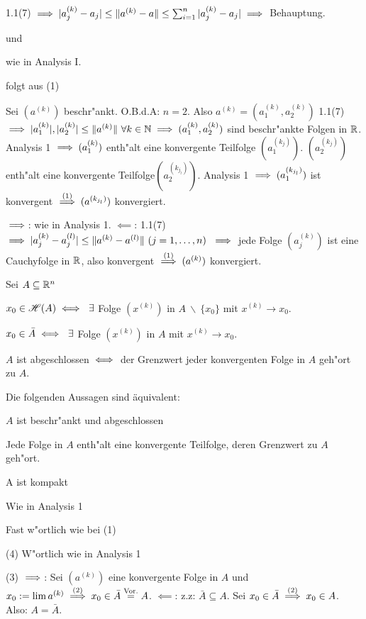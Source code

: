 \documentclass[a4paper,twoside,DIV15,BCOR12mm,chapterprefix=true,headings=twolinechapter]{scrbook}
\begin{document}
\begin{beweise}
  \item 1.1(7) $\implies |a_j^{(k)} - a_j| \le \|a^{(k)}-a\| \le \sum_{i=1}^n|a_j^{(k)} - a_j| \implies $ Behauptung.
  \item und
  \item wie in Analysis I.
  \item folgt aus (1)
  \item Sei $(a^{(k)})$ beschr"ankt. O.B.d.A: $n=2$. Also $a^{(k)}=(a_1^{(k)},a_2^{(k)})$ 1.1(7) $\implies |a_1^{(k)}|,|a_2^{(k)}|\le\|a^{(k)}\|\ \forall k\in\mathbb{N} \implies (a_1^{(k)},a_2^{(k)})$ sind beschr"ankte Folgen in $\mathbb{R}$. Analysis 1 $\implies (a_1^{(k)})$ enth"alt eine konvergente Teilfolge $(a_1^{(k_j)})$. $(a_2^{(k_j)})$ enth"alt eine konvergente Teilfolge$ (a_2^{(k_{j_l})})$. Analysis 1 $\implies (a_1^{(k_{j_l})})$ ist konvergent $\overset{(1)}{\implies} (a^{(k_{j_l})})$ konvergiert.
  \item \glqq$\implies$\grqq: wie in Analysis 1. \glqq$\impliedby$\grqq: 1.1(7) $\implies |a_j^{(k)}-a_j^{(l)}| \le \|a^{(k)}-a^{(l)}\|\ (j=1,\ldots,n)\ \implies$ jede Folge $(a_j^{(k)})$ ist eine Cauchyfolge in $\mathbb{R}$, also konvergent $\overset{(1)}{\implies} (a^{(k)})$ konvergiert.
\end{beweise}

\begin{satz}
Sei $A\subseteq\mathbb{R}^n$
\begin{liste}
\item $x_0 \in \mathscr{H}(A)\iff\ \exists$ Folge $(x^{(k)})$ in $A\ \backslash\ \{x_0\}$ mit $x^{(k)}\to x_0$.
\item $x_0 \in \bar A\iff\ \exists$ Folge $(x^{(k)})$ in $A$ mit $x^{(k)}\to x_0$.
\item $A$ ist abgeschlossen $\iff$ der Grenzwert jeder konvergenten Folge in $A$ geh"ort zu $A$.
\item Die folgenden Aussagen sind äquivalent:
    \begin{liste}
        \item $A$ ist beschr"ankt und abgeschlossen 
        \item Jede Folge in $A$ enth"alt eine konvergente Teilfolge, deren Grenzwert zu $A$ geh"ort.
        \item A ist kompakt
    \end{liste}
\end{liste}
\end{satz}

\begin{beweise}
\item Wie in Analysis 1
\item Fast w"ortlich wie bei (1)
\item[(4)] W"ortlich wie in Analysis 1
\item[(3)] \glqq$\implies$\grqq: Sei $(a^{(k)})$ eine konvergente Folge in $A$ und $x_0:=\lim a^{(k)} \overset{(2)}{\implies} x_0 \in \bar A \overset{\text{Vor.}}{=}A$. \glqq$\impliedby$\grqq: z.z: $\bar A \subseteq A$. Sei $x_0 \in \bar A \overset{(2)}{\implies}x_0 \in A$. Also: $A=\bar A$.
\end{beweise}
\end{document}
